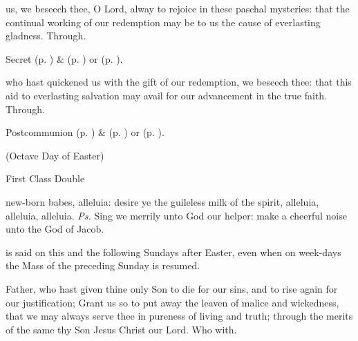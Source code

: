  us, we beseech thee, O Lord, alway to rejoice in these paschal mysteries: that the continual working of our redemption may be to us the cause of everlasting gladness. Through.
\begin{rubric}
     Secret  (p. \pageref{EasterSecret}) \&   (p. \pageref{SPAgainst}) or  (p. \pageref{SPChiefBishop}).
\end{rubric}


\vspace{-0.4\baselineskip}

\postcommunion

\vspace{-0.1\baselineskip}

 who hast quickened us with the gift of our redemption, we beseech thee: that this aid to everlasting salvation may avail for our advancement in the true faith. Through.
\begin{rubric}
     Postcommunion  (p. \pageref{EasterPostcommunion}) \&   (p. \pageref{SPAgainst}) or  (p. \pageref{SPChiefBishop}).
\end{rubric}


\clearpage
{}

\centerline{\small{(Octave Day of Easter)}}

\begin{inhead}
    {First Class Double}
\end{inhead}


\introit
{} new-born babes, alleluia: desire ye the guileless milk of the spirit, alleluia, alleluia, alleluia. \textit{Ps.} Sing we merrily unto God our helper: make a cheerful noise unto the God of Jacob.
\begin{rubric}
     is said on this and the following Sundays after Easter, even when on week-days the Mass of the preceding Sunday is resumed.
\end{rubric}
\collect
{} Father, who hast given thine only Son to die for our sins, and to rise again for our justification; Grant us so to put away the leaven of malice and wickedness, that we may always serve thee in pureness of living and truth; through the merits of the same thy Son Jesus Christ our Lord. Who with.

